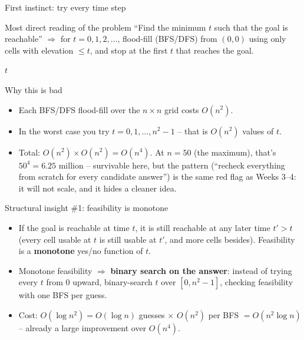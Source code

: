 \documentclass[11pt,aspectratio=169]{beamer}
\begin{document}
\begin{frame}{First instinct: try every time step}
  \begin{block}{Most direct reading of the problem}
    ``Find the minimum $t$ such that the goal is reachable'' $\Rightarrow$ for
    $t=0,1,2,\dots$, flood-fill (BFS/DFS) from $(0,0)$ using only cells with
    elevation $\le t$, and stop at the first $t$ that reaches the goal.
  \end{block}
  \begin{algorithmic}[1]
        \State \Return $t$
      \EndIf
    \EndFor
  \end{algorithmic}
\end{frame}

\begin{frame}{Why this is bad}
  \begin{itemize}
    \item Each BFS/DFS flood-fill over the $n\times n$ grid costs $O(n^2)$.
    \item In the worst case you try $t = 0,1,\dots,n^2-1$ -- that is $O(n^2)$
    values of $t$.
    \item Total: $O(n^2)\times O(n^2) = O(n^4)$. At $n=50$ (the maximum), that's
    $50^4 = 6.25$ million -- survivable here, but the pattern (``recheck
    everything from scratch for every candidate answer'') is the same
    red flag as Weeks 3--4: it will not scale, and it hides a cleaner idea.
  \end{itemize}
\end{frame}

\begin{frame}{Structural insight \#1: feasibility is monotone}
  \begin{itemize}
    \item If the goal is reachable at time $t$, it is still reachable at any
    later time $t' > t$ (every cell usable at $t$ is still usable at $t'$, and
    more cells besides). Feasibility is a \textbf{monotone} yes/no function of
    $t$.
    \item Monotone feasibility $\Rightarrow$ \textbf{binary search on the
    answer}: instead of trying every $t$ from $0$ upward, binary-search $t$ over
    $[0, n^2-1]$, checking feasibility with one BFS per guess.
    \item Cost: $O(\log n^2) = O(\log n)$ guesses $\times$ $O(n^2)$ per BFS
    $= O(n^2\log n)$ -- already a large improvement over $O(n^4)$.
  \end{itemize}
\end{frame}
\end{document}
